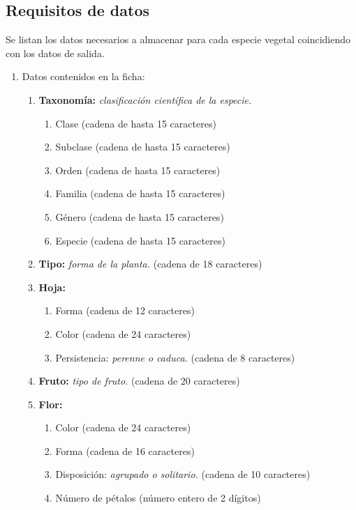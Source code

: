 \documentclass[10pt,a4paper]{article}
\begin{document}
\subsection{\textbf{Requisitos de datos}}

Se listan los datos necesarios a almacenar para cada especie vegetal coincidiendo con los datos de salida.
\newline
\begin{enumerate}[label={RD\arabic*.} ,leftmargin=2.8\parindent]
 
 	\item Datos contenidos en la ficha:
	\begin{enumerate}[label={RD1.\arabic*.}]
	
	\item 
		\textbf{Taxonomía:} \textit{clasificación científica de la especie.}
	\begin{enumerate}[label=-]
		\item Clase (cadena de hasta 15 caracteres)
		\item Subclase (cadena de hasta 15 caracteres)
		\item Orden (cadena de hasta 15 caracteres)
		\item Familia (cadena de hasta 15 caracteres)
		\item Género (cadena de hasta 15 caracteres)
		\item Especie (cadena de hasta 15 caracteres)
	\end{enumerate}
	\medskip
	
	\item 
		\textbf{Tipo:} \textit{forma de la planta.} (cadena de 18 caracteres)

	\medskip
	\item
		\textbf{Hoja:}
	\begin{enumerate}[label=-]
		\item Forma (cadena de 12 caracteres)
		\item Color (cadena de 24 caracteres)
		\item Persistencia: \textit{perenne o caduca.} (cadena de 8 caracteres)
	\end{enumerate}

	\medskip	
	\item
		\textbf{Fruto:} \textit{tipo de fruto.} (cadena de 20 caracteres)

	\medskip
	\item
		\textbf{Flor:}
	\begin{enumerate} [label=-]
		\item Color (cadena de 24 caracteres)
		\item Forma (cadena de 16 caracteres)
		\item Disposición: \textit{agrupado o solitario.} (cadena de 10 caracteres)
		\item Número de pétalos (número entero de 2 dígitos)
	\end{enumerate}


\end{enumerate}
\end{enumerate}
\end{document}
